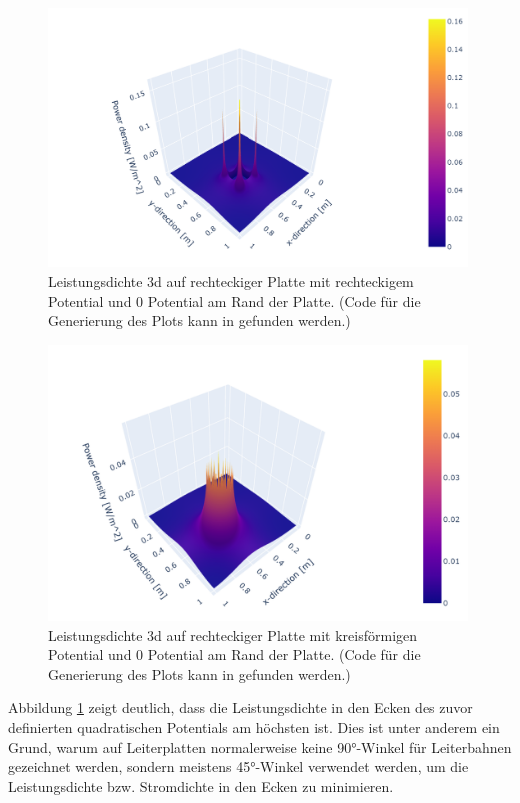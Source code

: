 \begin{figure}[h]
	\centering
	\includegraphics[width=0.99\textwidth]{papers/circuit/3d.png}
	\caption{Leistungsdichte 3d auf rechteckiger Platte mit rechteckigem Potential und 0 Potential am Rand der Platte. (Code für die Generierung des Plots kann in \cite{github:AndreasFMueller} gefunden werden.)}
	\label{fig:power_3d_rectangle}
\end{figure}
\begin{figure}[h]
	\centering
	\includegraphics[width=0.99\textwidth]{papers/circuit/3d_circle.png}
	\caption{Leistungsdichte 3d auf rechteckiger Platte mit kreisförmigen Potential und 0 Potential am Rand der Platte. (Code für die Generierung des Plots kann in \cite{github:AndreasFMueller} gefunden werden.)}
	\label{fig:power_3d_circle}
\end{figure}
Abbildung \ref{fig:power_3d_rectangle} zeigt deutlich, dass die Leistungsdichte in den Ecken des zuvor definierten quadratischen Potentials am höchsten ist. Dies ist unter anderem ein Grund, warum auf Leiterplatten normalerweise keine 90°-Winkel für Leiterbahnen gezeichnet werden, sondern meistens 45°-Winkel verwendet werden, um die Leistungsdichte bzw. Stromdichte in den Ecken zu minimieren.


